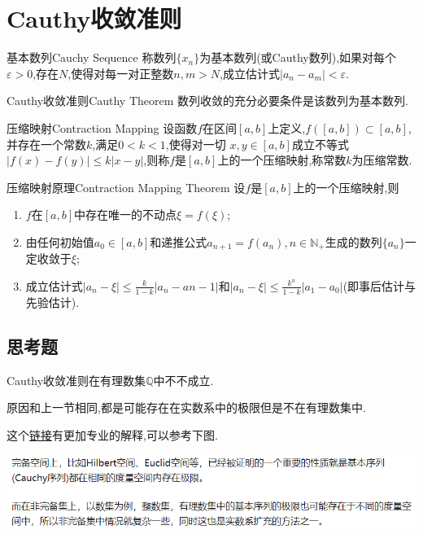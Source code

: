 \documentclass[cn,chinese,fontset]{elegantbook}
\begin{document}
    \section{Cauthy收敛准则}
        
        \begin{definition}{基本数列}{Cauchy Sequence}
            称数列$\{x_n\}$为基本数列(或Cauthy数列),如果对每个$\varepsilon>0$,存在$N$,使得对每一对正整数$n,m>N$,成立估计式$\lvert a_n-a_m\rvert<\varepsilon$.
        \end{definition}
        
        \begin{theorem}{Cauthy收敛准则}{Cauthy Theorem} 
            数列收敛的充分必要条件是该数列为基本数列.
        \end{theorem}
        
        \begin{definition}{压缩映射}{Contraction Mapping}
            设函数$f$在区间$[a,b]$上定义,$f([a,b])\subset [a,b]$,并存在一个常数$k$,满足$0<k<1$,使得对一切 $x,y\in [a,b]$成立不等式$\lvert f(x)-f(y)\rvert\leqslant k\lvert x-y\rvert$,则称$f$是$[a,b]$上的一个压缩映射,称常数$k$为压缩常数.
        \end{definition}
        \begin{theorem}{压缩映射原理}{Contraction Mapping Theorem}
            设$f$是$[a,b]$上的一个压缩映射,则
            \begin{enumerate}
                \item $f$在$[a,b]$中存在唯一的不动点$\xi=f(\xi)$;
                \item 由任何初始值$a_0\in[a,b]$和递推公式$a_{n+1}=f(a_n),n\in \mathbb{N}_+$生成的数列$\{a_n\}$一定收敛于$\xi$;
                \item 成立估计式$\lvert a_n-\xi\rvert\leqslant\frac{k}{1-k}\lvert a_n-a{n-1}\rvert$和$\lvert a_n-\xi\rvert\leqslant\frac{k^n}{1-k}\lvert a_1-a_0\rvert$(即事后估计与先验估计).
            \end{enumerate}
        \end{theorem}
            \subsection{思考题}
            \begin{example}
                Cauthy收敛准则在有理数集$\mathbb{Q}$中不不成立.
            \end{example}
            \begin{solution}
                原因和上一节相同,都是可能存在在实数系中的极限但是不在有理数集中.

                这个\href{https://www.zhihu.com/question/50995932/answer/866173110}{链接}有更加专业的解释,可以参考下图.

                \includegraphics[width=0.8\linewidth]{第三章 实数系的基本定理/3.4 Cauthy收敛准则/Cauthy收敛准则在Q中不成立.png}
            \end{solution}
        
\end{document}
